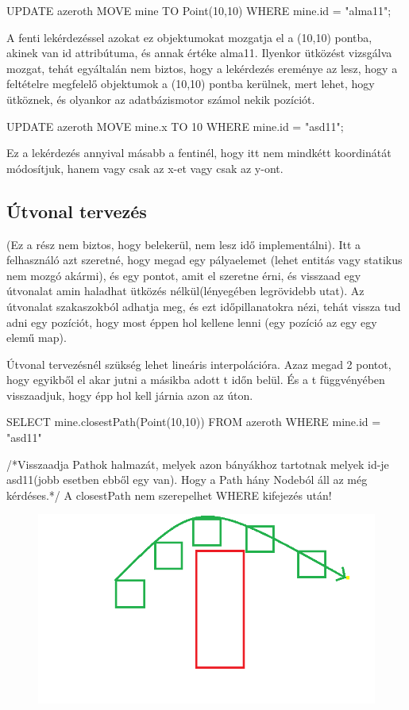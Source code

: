\begin{sql}
\begin{sql}
UPDATE azeroth MOVE  mine TO Point(10,10) WHERE mine.id = "alma11"; 
\end{sql}
A fenti lekérdezéssel azokat ez objektumokat mozgatja el a (10,10) pontba, akinek van id attribútuma, és annak értéke alma11. Ilyenkor ütközést vizsgálva mozgat, tehát egyáltalán nem biztos, hogy a lekérdezés ereménye az lesz, hogy a feltételre megfelelő objektumok a (10,10) pontba kerülnek, mert lehet, hogy ütköznek, és olyankor az adatbázismotor számol nekik pozíciót.
\begin{sql}
UPDATE azeroth MOVE  mine.x TO 10 WHERE mine.id = "asd11"; 
\end{sql}
Ez a lekérdezés annyival másabb a fentinél, hogy itt nem mindkétt koordinátát módosítjuk, hanem vagy csak az x-et vagy csak az y-ont.

\subsection{Útvonal tervezés}

(Ez a rész nem biztos, hogy belekerül, nem lesz idő implementálni). Itt a felhasználó azt szeretné, hogy megad egy pályaelemet (lehet entitás vagy statikus nem mozgó akármi), és egy pontot, amit el szeretne érni, és visszaad egy útvonalat amin haladhat ütközés nélkül(lényegében legrövidebb utat). Az útvonalat szakaszokból adhatja meg, és ezt időpillanatokra nézi, tehát vissza tud adni egy pozíciót, hogy most éppen hol kellene lenni (egy pozíció az egy egy elemű map).

Útvonal tervezésnél szükség lehet lineáris interpolációra. Azaz megad 2 pontot, hogy egyikből el akar jutni a másikba adott t időn belül. És a t függvényében visszaadjuk, hogy épp hol kell járnia azon az úton.

\begin{sql}
SELECT mine.closestPath(Point(10,10)) FROM azeroth WHERE mine.id = "asd11"
\end{sql}
/*Visszaadja Pathok halmazát, melyek azon bányákhoz tartotnak melyek id-je asd11(jobb esetben ebből egy van). Hogy a Path hány Nodeból áll az még kérdéses.*/
A closestPath nem szerepelhet WHERE kifejezés után!

\begin{figure}[htb]
\begin{center}
    \includegraphics[scale=0.5]{images/path}
    \caption{}
    \label{fig:path}
\end{center}
\end{figure}


\end{sql}
